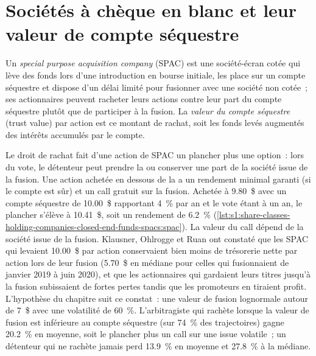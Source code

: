 \section{Sociétés à chèque en blanc et leur valeur de compte séquestre}

\begin{definition}\label{def:s1:share-classes-holding-companies-closed-end-funds-spacs:spac}
Un \emph{special purpose acquisition company} (SPAC) est une société-écran cotée qui lève des fonds lors d'une introduction en bourse initiale, les place sur un compte séquestre et dispose
d'un délai limité pour fusionner avec une société non cotée~; ses actionnaires peuvent racheter leurs actions contre leur part du compte séquestre plutôt que de participer à la fusion.
La \emph{valeur du compte séquestre} (trust value) par action est ce montant de rachat, soit les fonds levés augmentés des intérêts accumulés par le compte.
\end{definition}

Le droit de rachat fait d'une action de SPAC un plancher plus une option~: lors du vote, le détenteur peut prendre la  ou conserver une part de la société issue de la fusion. Une
action achetée en dessous de la  a un rendement minimal garanti (si le compte est sûr) et un call gratuit sur la fusion. Achetée à 9.80~\$ avec un compte séquestre de
10.00~\$ rapportant 4~\% par an et le vote étant à un an, le plancher s'élève à 10.41~\$, soit un rendement de 6.2~\% (\cref{lst:s1:share-classes-holding-companies-closed-end-funds-spacs:spac}).
La valeur du call dépend de la société issue de la fusion. Klausner, Ohlrogge et Ruan ont constaté que les SPAC qui levaient 10.00~\$ par action conservaient bien moins de trésorerie nette par action
lors de leur fusion (5.70~\$ en médiane pour celles qui fusionnaient de janvier 2019 à juin 2020), et que les actionnaires qui gardaient leurs titres jusqu'à la fusion subissaient de fortes
pertes tandis que les promoteurs en tiraient profit. L'hypothèse du chapitre suit ce constat~: une valeur de fusion lognormale autour de 7~\$ avec une volatilité de 60~\%. L'arbitragiste
qui rachète lorsque la valeur de fusion est inférieure au compte séquestre (sur 74~\% des trajectoires) gagne 20.2~\% en moyenne, soit le plancher plus un call sur une issue volatile~; un détenteur
qui ne rachète jamais perd 13.9~\% en moyenne et 27.8~\% à la médiane.


